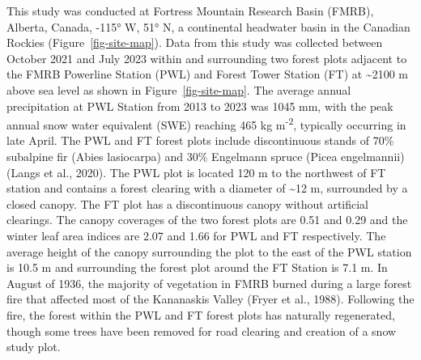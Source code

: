 \documentclass[
  letterpaper,
  DIV=11,
  numbers=noendperiod]{scrartcl}
\begin{document}
This study was conducted at Fortress Mountain Research Basin (FMRB),
Alberta, Canada, -115° W, 51° N, a continental headwater basin in the
Canadian Rockies (Figure~\ref{fig-site-map}). Data from this study was
collected between October 2021 and July 2023 within and surrounding two
forest plots adjacent to the FMRB Powerline Station (PWL) and Forest
Tower Station (FT) at \textasciitilde2100 m above sea level as shown in
Figure~\ref{fig-site-map}. The average annual precipitation at PWL
Station from 2013 to 2023 was 1045 mm, with the peak annual snow water
equivalent (SWE) reaching 465 kg m\textsuperscript{-2}, typically
occurring in late April. The PWL and FT forest plots include
discontinuous stands of 70\% subalpine fir (Abies lasiocarpa) and 30\%
Engelmann spruce (Picea engelmannii) (Langs et al., 2020). The PWL plot
is located 120 m to the northwest of FT station and contains a forest
clearing with a diameter of \textasciitilde12 m, surrounded by a closed
canopy. The FT plot has a discontinuous canopy without artificial
clearings. The canopy coverages of the two forest plots are 0.51 and
0.29 and the winter leaf area indices are 2.07 and 1.66 for PWL and FT
respectively. The average height of the canopy surrounding the plot to
the east of the PWL station is 10.5 m and surrounding the forest plot
around the FT Station is 7.1 m. In August of 1936, the majority of
vegetation in FMRB burned during a large forest fire that affected most
of the Kananaskis Valley (Fryer et al., 1988). Following the fire, the
forest within the PWL and FT forest plots has naturally regenerated,
though some trees have been removed for road clearing and creation of a
snow study plot.
\end{document}
